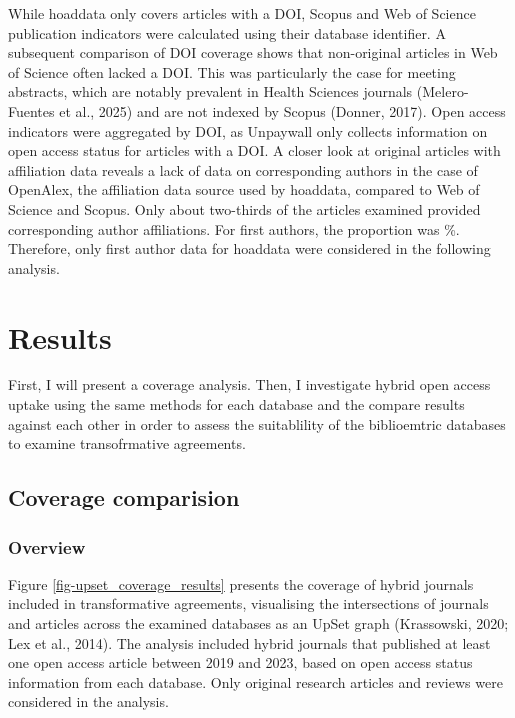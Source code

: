 \documentclass[a4paper,man,floatsintext,longtable,noextraspace,10pt]{apa6}
\begin{document}
While hoaddata only covers articles with a DOI, Scopus and Web of
Science publication indicators were calculated using their database
identifier. A subsequent comparison of DOI coverage shows that
non-original articles in Web of Science often lacked a DOI. This was
particularly the case for meeting abstracts, which are notably prevalent
in Health Sciences journals (Melero-Fuentes et al., 2025) and are not
indexed by Scopus (Donner, 2017). Open access indicators were aggregated
by DOI, as Unpaywall only collects information on open access status for
articles with a DOI. A closer look at original articles with affiliation
data reveals a lack of data on corresponding authors in the case of
OpenAlex, the affiliation data source used by hoaddata, compared to Web
of Science and Scopus. Only about two-thirds of the articles examined
provided corresponding author affiliations. For first authors, the
proportion was \%. Therefore, only first author data for hoaddata were
considered in the following analysis.

\section{Results}\label{results}

First, I will present a coverage analysis. Then, I investigate hybrid
open access uptake using the same methods for each database and the
compare results against each other in order to assess the suitablility
of the biblioemtric databases to examine transofrmative agreements.

\subsection{Coverage comparision}\label{coverage-comparision}

\subsubsection{Overview}\label{overview}

Figure \ref{fig-upset_coverage_results} presents the coverage of hybrid
journals included in transformative agreements, visualising the
intersections of journals and articles across the examined databases as
an UpSet graph (Krassowski, 2020; Lex et al., 2014). The analysis
included hybrid journals that published at least one open access article
between 2019 and 2023, based on open access status information from each
database. Only original research articles and reviews were considered in
the analysis.
\end{document}
